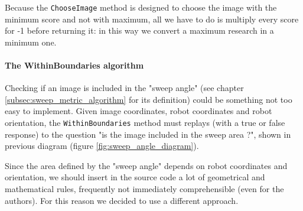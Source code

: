 %
Because the \texttt{ChooseImage} method is designed to choose the image with the minimum score and not with maximum,
all we have to do is multiply every score for -1 before returning it: in this way we convert a maximum research in
a minimum one.
%

%
\paragraph{The WithinBoundaries algorithm}
\label{par:withinboundaries}

Checking if an image is included in the "sweep angle" (see chapter \ref{subsec:sweep_metric_algorithm} for its
definition) could be something not too easy to implement. Given image coordinates, robot coordinates and robot
orientation, the \texttt{WithinBoundaries} method must replays (with a true or false response) to the question
"is the image included in the sweep area ?", shown in previous diagram (figure \ref{fig:sweep_angle_diagram}).
%

%
Since the area defined by the "sweep angle" depends on robot coordinates and orientation, we should insert in
the source code a lot of geometrical and mathematical rules, frequently not immediately comprehensible
(even for the authors). For this reason we decided to use a different approach.
%

